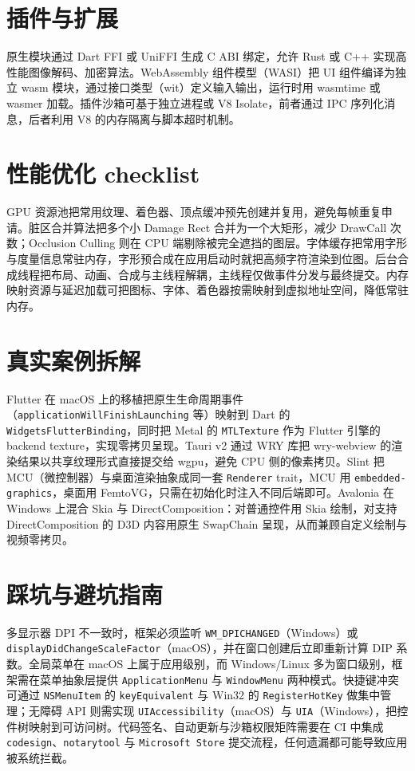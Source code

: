 \chapter{插件与扩展}
原生模块通过 Dart FFI 或 UniFFI 生成 C ABI 绑定，允许 Rust 或 C++ 实现高性能图像解码、加密算法。WebAssembly 组件模型（WASI）把 UI 组件编译为独立 wasm 模块，通过接口类型（wit）定义输入输出，运行时用 wasmtime 或 wasmer 加载。插件沙箱可基于独立进程或 V8 Isolate，前者通过 IPC 序列化消息，后者利用 V8 的内存隔离与脚本超时机制。\par
\chapter{性能优化 checklist}
GPU 资源池把常用纹理、着色器、顶点缓冲预先创建并复用，避免每帧重复申请。脏区合并算法把多个小 Damage Rect 合并为一个大矩形，减少 DrawCall 次数；Occlusion Culling 则在 CPU 端剔除被完全遮挡的图层。字体缓存把常用字形与度量信息常驻内存，字形预合成在应用启动时就把高频字符渲染到位图。后台合成线程把布局、动画、合成与主线程解耦，主线程仅做事件分发与最终提交。内存映射资源与延迟加载可把图标、字体、着色器按需映射到虚拟地址空间，降低常驻内存。\par
\chapter{真实案例拆解}
Flutter 在 macOS 上的移植把原生生命周期事件（\texttt{applicationWillFinishLaunching} 等）映射到 Dart 的 \texttt{WidgetsFlutterBinding}，同时把 Metal 的 \texttt{MTLTexture} 作为 Flutter 引擎的 backend texture，实现零拷贝呈现。Tauri v2 通过 WRY 库把 wry-webview 的渲染结果以共享纹理形式直接提交给 wgpu，避免 CPU 侧的像素拷贝。Slint 把 MCU（微控制器）与桌面渲染抽象成同一套 \texttt{Renderer} trait，MCU 用 \texttt{embedded-graphics}，桌面用 FemtoVG，只需在初始化时注入不同后端即可。Avalonia 在 Windows 上混合 Skia 与 DirectComposition：对普通控件用 Skia 绘制，对支持 DirectComposition 的 D3D 内容用原生 SwapChain 呈现，从而兼顾自定义绘制与视频零拷贝。\par
\chapter{踩坑与避坑指南}
多显示器 DPI 不一致时，框架必须监听 \texttt{WM\_{}DPICHANGED}（Windows）或 \texttt{displayDidChangeScaleFactor}（macOS），并在窗口创建后立即重新计算 DIP 系数。全局菜单在 macOS 上属于应用级别，而 Windows/Linux 多为窗口级别，框架需在菜单抽象层提供 \texttt{ApplicationMenu} 与 \texttt{WindowMenu} 两种模式。快捷键冲突可通过 \texttt{NSMenuItem} 的 \texttt{keyEquivalent} 与 Win32 的 \texttt{RegisterHotKey} 做集中管理；无障碍 API 则需实现 \texttt{UIAccessibility}（macOS）与 \texttt{UIA}（Windows），把控件树映射到可访问树。代码签名、自动更新与沙箱权限矩阵需要在 CI 中集成 \texttt{codesign}、\texttt{notarytool} 与 \texttt{Microsoft Store} 提交流程，任何遗漏都可能导致应用被系统拦截。\par
